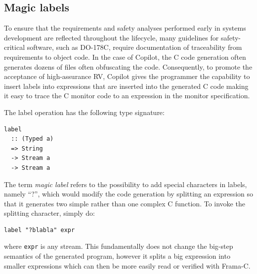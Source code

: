 \subsection{Magic labels}
\label{sec:magiclabels}
To ensure that the requirements and safety analyses performed early in
systems development are reflected throughout the lifecycle, many
guidelines for safety-critical software, such as DO-178C, require
documentation of traceability from requirements to object
code. In the case of Copilot, the C code generation often generates
dozens of files often obfuscating the code. Consequently, to promote the acceptance of high-assurance RV,
Copilot gives the programmer the capability to insert labels into
expressions that are inserted into the generated C code making it easy
to trace the  C monitor code to an expression in the monitor
specification.  

The label operation has the following  type signature:

\begin{lstlisting}[language = Copilot, frame = single]
label
  :: (Typed a)
  => String
  -> Stream a
  -> Stream a
\end{lstlisting}


The term \emph{magic label} refers to the possibility to add special characters
in labels, namely ``?'', which would modify the code generation by
splitting an expression so that it generates two simple rather than
one complex C function. To invoke the
splitting character, simply do:

\begin{lstlisting}[language = Copilot, frame = single]
label "?blabla" expr
\end{lstlisting}

\noindent where \texttt{expr} is any stream. This fundamentally does not
change the big-step semantics of the generated program, however it splits a big
expression into smaller expressions which can then be more easily read or
verified with Frama-C.






